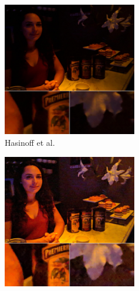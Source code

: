\documentclass{sig-alternate}
\begin{document}
\begin{figure}
\centering
\begin{subfigure}{13.8pc}
\centering
\includegraphics[width=13.8pc]{figures/liba2019-figure-1a-95quality.jpg}
\caption{Hasinoff et al.}
\label{fig:libaResults:hasinoff}
\end{subfigure}
\begin{subfigure}{13.8pc}
\centering
\includegraphics[width=13.8pc]{figures/liba2019-figure-1b-95quality.jpg}

\end{subfigure}
\end{figure}
\end{document}
